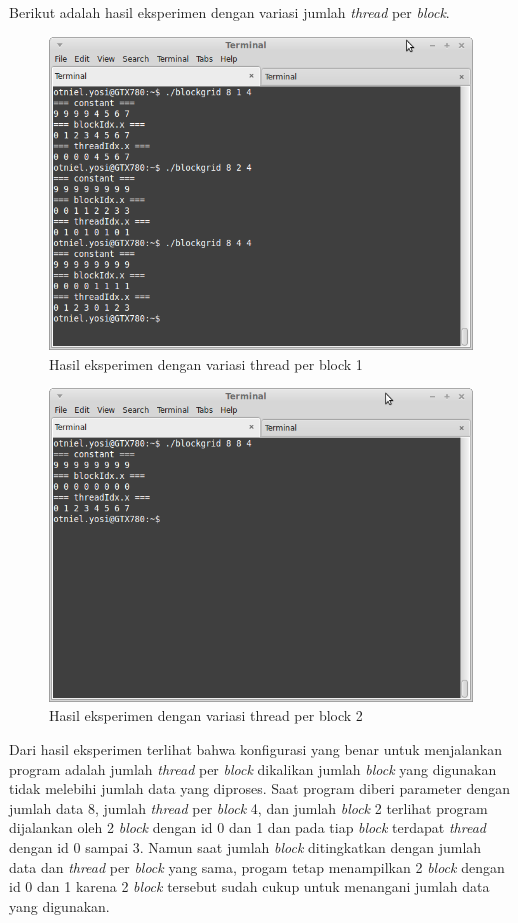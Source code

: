 Berikut adalah hasil eksperimen dengan variasi jumlah \textit{thread} per \textit{block}.

\begin{figure}
	\centering
	\includegraphics[width=1\textwidth]
	{pics/grid1}
	\caption{Hasil eksperimen dengan variasi thread per block 1}
	\label{fig:block_demo1}
\end{figure}  

\begin{figure}
	\centering
	\includegraphics[width=1\textwidth]
	{pics/grid2}
	\caption{Hasil eksperimen dengan variasi thread per block 2}
	\label{fig:block_demo2}
\end{figure}

Dari hasil eksperimen terlihat bahwa konfigurasi yang benar untuk menjalankan program adalah jumlah \textit{thread} per \textit{block} dikalikan jumlah \textit{block} yang digunakan tidak melebihi jumlah data yang diproses.  Saat program diberi parameter dengan jumlah data 8, jumlah \textit{thread} per \textit{block} 4, dan jumlah \textit{block} 2 terlihat program dijalankan oleh 2 \textit{block} dengan id 0 dan 1 dan pada tiap \textit{block} terdapat \textit{thread} dengan id 0 sampai 3.  Namun saat jumlah \textit{block} ditingkatkan dengan jumlah data dan \textit{thread} per \textit{block} yang sama, progam tetap menampilkan 2 \textit{block} dengan id 0 dan 1 karena 2 \textit{block} tersebut sudah cukup untuk menangani jumlah data yang digunakan.

